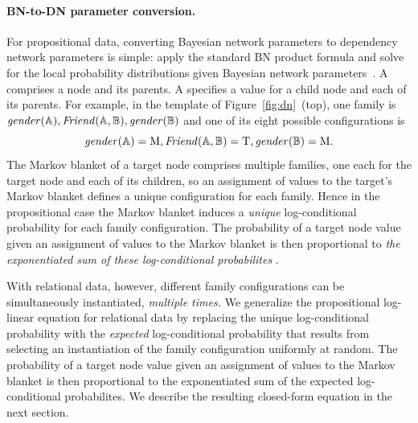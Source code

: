 \documentclass[runningheads,a4paper]{llncs}
\begin{document}
\paragraph{BN-to-DN parameter conversion.}  For propositional data, converting Bayesian network parameters to dependency network parameters is simple: apply the standard BN product formula and solve for the local probability distributions given Bayesian network parameters~\cite[Ch.14.5.2]{Russell2010}. A  comprises a node and its parents. A  specifies a value for a child node and each of its parents. For example, in the template of Figure~\ref{fig:dn}~(top), one family is $\it{gender}(\mathbb{A}), \it{Friend}(\mathbb{A},\mathbb{B}), \it{gender}(\mathbb{B})$ and one of its eight possible configurations is
$$\it{gender}(\mathbb{A}) = \mathrm{M}, \it{Friend}(\mathbb{A},\mathbb{B}) = \mathrm{T}, \it{gender}(\mathbb{B}) = \mathrm{M}.$$
The Markov blanket of a target node comprises multiple families, one each for the target node and each of its children, so
an assignment of values to the target's Markov blanket defines a unique configuration for each family. Hence in the propositional case the Markov blanket induces a {\em unique} log-conditional probability for each family configuration. The probability of a target node value given an assignment of values to the Markov blanket is then proportional to {\em the exponentiated sum of these log-conditional probabilites} \cite[Ch.14.5.2]{Russell2010}.

With relational data, however, different family configurations can be simultaneously instantiated, {\em multiple times.}  We generalize the propositional log-linear equation for relational data by replacing the unique log-conditional probability with the {\em expected} log-conditional probability that results from selecting an instantiation of the family configuration uniformly at random. The probability of a target node value given an assignment of values to the Markov blanket is then proportional to the exponentiated sum of the expected log-conditional probabilites. %
We describe the resulting closed-form equation in the next section. 
\end{document}
